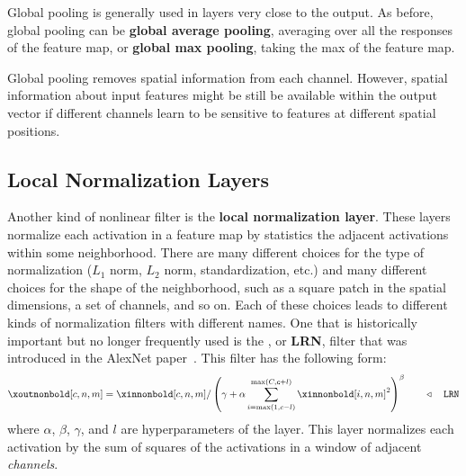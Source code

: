 Global pooling is generally used in layers very close to the output. As before, global pooling can be {\bf global average pooling}, averaging over all the responses of the feature map, or {\bf global max pooling}, taking the max of the feature map.

Global pooling removes spatial information from each channel. However, spatial information about input features might be still be available within the output vector if different channels learn to be sensitive to features at different spatial positions.

\subsection{Local Normalization Layers}

Another kind of nonlinear filter is the {\bf local normalization layer}. These layers normalize each activation in a feature map by statistics the adjacent activations within some neighborhood. There are many different choices for the type of normalization ($L_1$ norm, $L_2$ norm, standardization, etc.) and many different choices for the shape of the neighborhood, such as a square patch in the spatial dimensions, a set of channels, and so on. Each of these choices leads to different kinds of normalization filters with different names. One that is historically important but no longer frequently used is the , or {\bf LRN}, filter that was introduced in the AlexNet paper~\cite{krizhevsky2012imagenet}. This filter has the following form:
\begin{align}
    \xoutnonbold[c,n,m] = \xinnonbold[c,n,m] / \left( \gamma + \alpha \sum_{i=\max(1,c-l)}^{\max(C,c+l)} \xinnonbold[i,n,m]^2 \right) ^\beta \quad\quad \triangleleft \quad\texttt{LRN} \label{eqn:convolutional_neural_nets:LRN}
\end{align}
where $\alpha$, $\beta$, $\gamma$, and $l$ are hyperparameters of the layer. This layer normalizes each activation by the sum of squares of the activations in a window of adjacent \textit{channels}.


